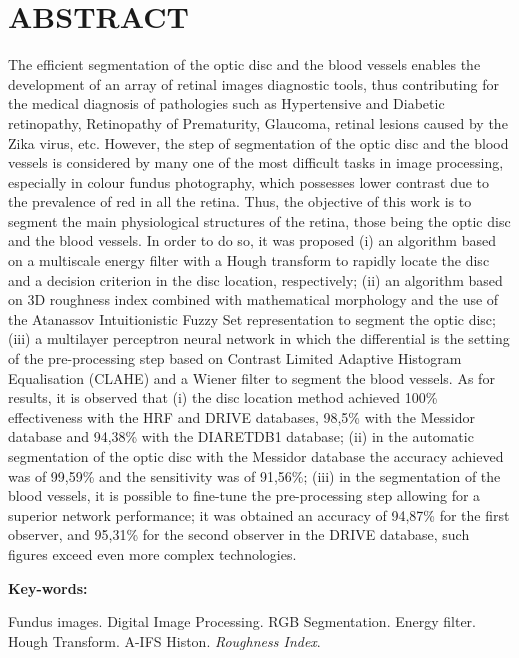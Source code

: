 \chapter*{ABSTRACT} 
\thispagestyle{empty}

The efficient segmentation of the optic disc and the blood vessels enables the development of an array of retinal images diagnostic tools, thus contributing for the medical diagnosis of pathologies such as Hypertensive and Diabetic retinopathy, Retinopathy of Prematurity, Glaucoma, retinal lesions caused by the Zika virus, etc. However, the step of segmentation of the optic disc and the blood vessels is considered by many one of the most difficult tasks in image processing, especially in colour fundus photography, which possesses lower contrast due to the prevalence of red in all the retina. Thus, the objective of this work is to segment the main physiological structures of the retina, those being the optic disc and the blood vessels. In order to do so, it was proposed (i) an algorithm based on a multiscale energy filter with a Hough transform to rapidly locate the disc and a decision criterion in the disc location, respectively; (ii) an algorithm based on 3D roughness index combined with mathematical morphology and the use of the Atanassov Intuitionistic Fuzzy Set representation to segment the optic disc; (iii) a multilayer perceptron neural network in which the differential is the setting of the pre-processing step based on Contrast Limited Adaptive Histogram Equalisation (CLAHE) and a Wiener filter to segment the blood vessels. As for results, it is observed that (i) the disc location method achieved 100\% effectiveness with the HRF and DRIVE databases, 98,5\% with the Messidor database and 94,38\% with the DIARETDB1 database; (ii) in the automatic segmentation of the optic disc with the Messidor database the accuracy achieved was of 99,59\% and the sensitivity was of 91,56\%; (iii) in the segmentation of the blood vessels, it is possible to fine-tune the pre-processing step allowing for a superior network performance; it was obtained an accuracy of 94,87\% for the first observer, and 95,31\% for the second observer in the DRIVE database, such figures exceed even more complex technologies.

\vspace{2cm}
{\Large \textbf{Key-words:}}
\vspace{0.4cm}


Fundus images. Digital Image Processing. RGB Segmentation. Energy filter. Hough Transform. A-IFS Histon. \textit{Roughness Index}. 

